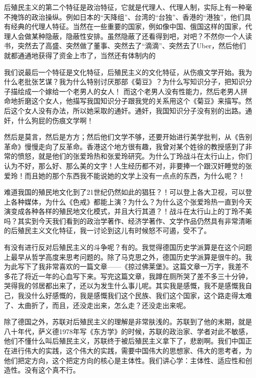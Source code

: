 \documentclass[UTF8, 12pt, a4paper]{ctexrep}
\begin{document}
后殖民主义的第二个特征是政治特征，它就是代理人、代理人制，实际上有一种毫不掩饰的政治操纵。例如日本的“天降组”、台湾的“台独”、香港的“港独”，他们具有经典的代理人特征。当然在一些重要的国家，例如像中国、俄国这样的国家，代理人会做某种隐蔽，隐蔽性安排。虽然隐蔽了还看得到吧，对吧？不然你一个人读书，突然去了高盛、突然做了董事、突然去了“滴滴”、突然去了Uber，然后他们就都通通地获得了资金上市了，当然还有体制内的

我们说最后一个特征是文化特征，后殖民主义的文化特征，从伤痕文学开始。我为什么老批张艺谋？我为什么特别讨厌那部《菊豆》？为什么写知识分子，把知识分子描绘成一个嫁给一个老男人的女人！ 而这个老男人没有性能力，然后老男人拼命地折磨这个女人，他描写我国知识分子跟我党的关系用这个《菊豆》来描写。然后这个女人没有办法，所以她采取的通奸。通奸，我国知识分子没有别的出路。通奸，什么狗屁的伤痕文学啊！

然后是莫言，然后是方方；然后他们文学不够，还要开始进行美学批判，从《告别革命》慢慢走向了反革命。香港这个地方很有趣，我曾对某个姓徐的教授感到了非常的愤怒，就是他们的张爱玲热和张爱玲研究。为什么丁玲战斗在太行山上，你们认为不好，那么好、那么美的文字！人生经历都不对，非要捧一个跟汉奸睡觉的张爱玲！而且她的那个东西我不能说她的文学上没有一点点的东西，为什么呢？！

难道我国的殖民地文化到了21世纪仍然如此的猖狂？！可以登上各大卫视，可以登上各种媒体，为什么《色戒》都能上演？为什么？为什么这个张爱玲热一直到今天演变成各种各样的殖民地文化模式，并且大行其道？！战斗在太行山上的丁玲不美吗？其实到今天我们看到的政治学著作、经济学著作、文学作品仍然具有非常清晰的后殖民主义文化特征，我一讨论到这儿有时候怒不可遏，受不了。

有没有进行反对后殖民主义的斗争呢？有的。我觉得德国历史学派算是在这个问题上最早从哲学高度来思考问题的。除了马克思之外，德国历史学派算是很牛的。我为此写下了我非常喜欢的一篇文章——《掠过佛莱堡》。这篇文章一万字，我差不多花了将近一年的心血写下来。写完这篇文章，我蹲在厕所哭了差不多三十分钟，哭得我的邻居都出来了，还以为发生什么事儿呢。其实我是感慨，我不是感慨我自己，我没什么好感慨的，我是感慨我们这个民族、我们这个国家，这个路走得太难了、太曲折了，而且，还没走出来，怎么走？还没走出来呢。

除了德国之外，苏联对后殖民主义的理解是非常肤浅的。苏联到了他的末期，就是八十年代，萨义德1978年写《东方学》的时候，苏联的政治家、学者对此不敏感，他们不懂什么叫后殖民主义，苏联终于被后殖民主义拿下了，悲剧啊。我们中国正在进行伟大的实践，这个伟大的实践，需要中国伟大的思想家、伟大的思考者，为他们把定方向，这个把定方向的核心是主体性。我们讲心学：主体性、适应性和创造性。没有这个真不行。
\end{document}

